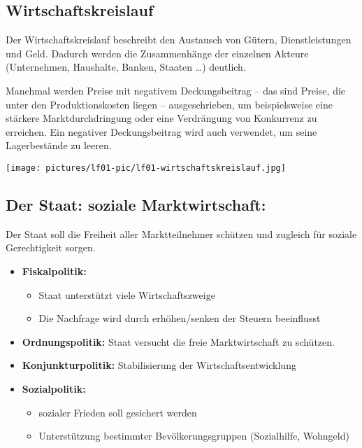 
\subsection{Wirtschaftskreislauf}

Der Wirtschaftskreislauf beschreibt den Austausch von Gütern, Dienstleistungen und Geld. Dadurch werden die Zusammenhänge der einzelnen Akteure (Unternehmen, Haushalte, Banken, Staaten \dots) deutlich.

Manchmal werden Preise mit negativem Deckungsbeitrag -- das sind Preise, die unter den Produktionskosten liegen -- ausgeschrieben, um beispielsweise eine stärkere Marktdurchdringung oder eine Verdrängung von Konkurrenz zu erreichen. Ein negativer Deckungsbeitrag wird auch verwendet, um seine Lagerbestände zu leeren.

\texttt{[image: pictures/lf01-pic/lf01-wirtschaftskreislauf.jpg]}


\subsection{Der Staat: soziale Marktwirtschaft:}

Der Staat soll die Freiheit aller Marktteilnehmer schützen und zugleich für soziale Gerechtigkeit sorgen.

\begin{itemize}
	\item \textbf{Fiskalpolitik:} 
	\begin{itemize}
		\item Staat unterstützt viele Wirtschaftszweige
		\item Die Nachfrage wird durch erhöhen/senken der Steuern beeinflusst
	\end{itemize}
	\item \textbf{Ordnungspolitik:} Staat versucht die freie Marktwirtschaft zu schützen.
	\item \textbf{Konjunkturpolitik:} Stabilisierung der Wirtschaftsentwicklung
	\item \textbf{Sozialpolitik:} 
	\begin{itemize}
		\item sozialer Frieden soll gesichert werden
		\item Unterstützung bestimmter Bevölkerungsgruppen (Sozialhilfe, Wohngeld)
	\end{itemize}
\end{itemize}
	
